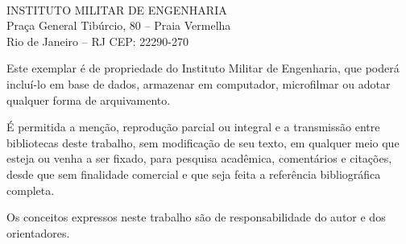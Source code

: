 \documentclass[
	12pt,				%
	openright,			%
    oneside,
	a4paper,			%
	chapter=TITLE,
	english,			%
	brazil				%
	]{./abntex2}
\begin{document}
\begin{fichacatalografica}
    \sffamily
    \begin{normalsize}
        \noindent{\faCopyright\imprimirdata}\\
        INSTITUTO MILITAR DE ENGENHARIA\\
        Praça General Tibúrcio, 80 – Praia Vermelha\\
        Rio de Janeiro – RJ CEP: 22290-270\\
        \par\noindent
        Este exemplar é de propriedade do Instituto Militar de Engenharia, que poderá incluí-lo em base de dados, armazenar em computador, microfilmar ou adotar qualquer forma de arquivamento.
        \par\noindent
        É permitida a menção, reprodução parcial ou integral e a transmissão entre bibliotecas deste trabalho, sem modificação de seu texto, em qualquer meio que esteja ou venha a ser fixado, para pesquisa acadêmica, comentários e citações, desde que sem finalidade comercial e que seja feita a referência bibliográfica completa.
        \par\noindent
        Os conceitos expressos neste trabalho são de responsabilidade do autor e dos orientadores.
    \end{normalsize}
    
    \vspace*{\fill}
    
    \begin{center}
        \fbox{\begin{minipage}[c][10cm]{13.5cm}
                \small
                

\end{minipage}}
\end{center}
\end{fichacatalografica}
\end{document}
